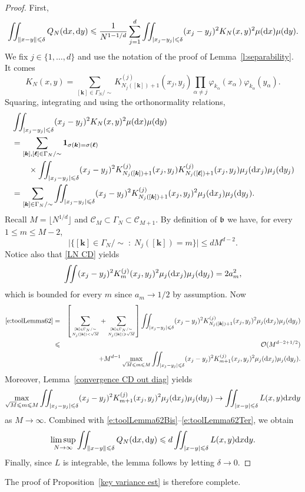 \documentclass[a4paper,11pt]{article}
\numberwithin{equation}{section}
\theoremstyle{definition}
\newcommand{\eq}{\begin{equation}}
\newcommand{\qe}{\end{equation}}
\newcommand{\cO}{\mathcal{O}}
\newcommand{\bs}{\boldsymbol}
\newcommand{\gfrac}[2]{\genfrac{}{}{0pt}{}{#1}{#2}}
\renewcommand{\leq}{\leqslant}
\renewcommand{\geq}{\geqslant}
\renewcommand{\phi}{\varphi}
\renewcommand{\d}{ {\rm d}}
\begin{document}
 \begin{proof}
 First,
 \eq
 \iint_{\|x-y\|\leq \delta}  Q_N(\d x,\d y) \leq \frac1{N^{1-1/d}}\sum_{j=1}^d
 \iint_{|x_j-y_j|\leq \delta}  (x_j-y_j)^2K_N(x,y)^2\mu(\d x)\mu(\d y).
\label{e:toolLemma62Bis}
 \qe
We fix $j\in\{1,\dots,d\}$ and use the notation of the proof of Lemma~\ref{l:separability}. It comes
 \[
K_N(x,y)= \sum_{[\bs k]\in \Gamma_N/\sim}K^{(j)}_{N_j([\bs
  k])+1}(x_j,y_j)\prod_{\alpha\neq j}\phi_{k_\alpha}(x_\alpha)\phi_{k_\alpha}(y_\alpha) .
  \]
  Squaring, integrating and using the orthonormality relations,
  \begin{align}
&  \iint_{|x_j-y_j|\leq \delta}  (x_j-y_j)^2K_N(x,y)^2\mu(\d x)\mu(\d y)\nonumber\\
  &  = \sum_{[\bs k],[\bs \ell] \in \Gamma_N/\sim} \bs 1_{\sigma(\bs k)=\sigma(\bs \ell)}\nonumber\\
  & \qquad  \times\iint_{|x_j-y_j|\leq\delta} (x_j-y_j)^2K^{(j)}_{N_j([\bs k])+1}(x_j,y_j)K^{(j)}_{N_j([\bs \ell])+1}(x_j,y_j)\mu_j(\d x_j)\mu_j(\d y_j)\nonumber\\
    &   = \sum_{[\bs k]\in \Gamma_N/\sim}\iint_{|x_j-y_j|\leq\delta} (x_j-y_j)^2K^{(j)}_{N_j([\bs k])+1}(x_j,y_j)^2\mu_j(\d x_j)\mu_j(\d y_j).
\label{e:toolLemma62}
  \end{align}
Recall $M=\lfloor N^{1/d}\rfloor$ and $\mathcal{C}_M\subset\Gamma_N\subset\mathcal{C}_{M+1}$. By definition of
$\frak b$ we have, for every $1\leq m\leq M-2$,
$$ \vert \{ [\bs k]\in \Gamma_N/\sim \;:\; N_j([\bs k]) = m \}\vert \leq dM^{d-2}.$$
Notice also that \eqref{LN CD} yields
$$
\iint (x_j-y_j)^2 K^{(j)}_{m}(x_j,y_j)^2\mu_j(\d x_j)\mu_j(\d y_j) = 2a_m^2,
$$
which is bounded for every $m$ since $a_m\rightarrow 1/2$ by assumption. Now
\begin{eqnarray}
\eqref{e:toolLemma62} &=& \left[ \sum_{\gfrac{[\bs k]\in
                             \Gamma_N/\sim}{N_j([\bs k])< \sqrt{M}}} + \sum_{\gfrac{[\bs k]\in
                             \Gamma_N/\sim}{N_j([\bs k])\geq \sqrt{M}}}  \right] \iint_{|x_j-y_j|\leq\delta} (x_j-y_j)^2K^{(j)}_{N_j([\bs k])+1}(x_j,y_j)^2\mu_j(\d x_j)\mu_j(\d y_j) \nonumber\\
&\leq& \cO(M^{d-2+1/2}) \nonumber\\
&&\quad+ M^{d-1}\max_{\sqrt{M}\leq m \leq M}
       \iint_{|x_j-y_j|\leq\delta} (x_j-y_j)^2K^{(j)}_{m+1}(x_j,y_j)^2\mu_j(\d
       x_j)\mu_j(\d y_j).
\label{e:toolLemma62Ter}
\end{eqnarray}
Moreover, Lemma~\ref{convergence CD out diag} yields
\[
\max_{\sqrt{M}\leq m \leq M} \iint_{|x_j-y_j|\leq\delta} (x_j-y_j)^2K^{(j)}_{m+1}(x_j,y_j)^2\mu_j(\d
 x_j)\mu_j(\d y_j) \rightarrow \iint_{|x-y|\leq\delta}L(x,y)\d x\d y
\]
as $M\rightarrow \infty$. Combined with \eqref{e:toolLemma62Bis}--\eqref{e:toolLemma62Ter}, we obtain
$$
\limsup_{N\rightarrow \infty}\iint_{\|x-y\|\leq \delta}  Q_N(\d x,\d y) \leq d\iint_{|x-y|\leq\delta}L(x,y)\d x\d y.
$$
Finally, since $L$ is integrable, the lemma follows by letting $\delta\to0$.
\end{proof}
The proof of Proposition~\ref{key variance est} is therefore complete.
\end{document}
